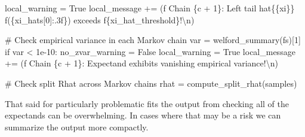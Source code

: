 \documentclass[
  letterpaper,
  DIV=11,
  numbers=noendperiod]{scrartcl}
\newenvironment{Shaded}{\begin{snugshade}}{\end{snugshade}}
\newcommand{\CharTok}[1]{\textcolor[rgb]{0.13,0.47,0.30}{#1}}
\newcommand{\CommentTok}[1]{\textcolor[rgb]{0.37,0.37,0.37}{#1}}
\newcommand{\ControlFlowTok}[1]{\textcolor[rgb]{0.00,0.23,0.31}{#1}}
\newcommand{\DecValTok}[1]{\textcolor[rgb]{0.68,0.00,0.00}{#1}}
\newcommand{\FloatTok}[1]{\textcolor[rgb]{0.68,0.00,0.00}{#1}}
\newcommand{\NormalTok}[1]{\textcolor[rgb]{0.00,0.23,0.31}{#1}}
\newcommand{\OperatorTok}[1]{\textcolor[rgb]{0.37,0.37,0.37}{#1}}
\newcommand{\SpecialCharTok}[1]{\textcolor[rgb]{0.37,0.37,0.37}{#1}}
\newcommand{\SpecialStringTok}[1]{\textcolor[rgb]{0.13,0.47,0.30}{#1}}
\newcommand{\StringTok}[1]{\textcolor[rgb]{0.13,0.47,0.30}{#1}}
\newcommand{\VariableTok}[1]{\textcolor[rgb]{0.07,0.07,0.07}{#1}}
\begin{document}
\begin{Shaded}
\begin{Highlighting}[]
\NormalTok{        local\_warning }\OperatorTok{=} \VariableTok{True}
\NormalTok{        local\_message }\OperatorTok{+=}\NormalTok{ (}\SpecialStringTok{f\textquotesingle{}  Chain }\SpecialCharTok{\{}\NormalTok{c }\OperatorTok{+} \DecValTok{1}\SpecialCharTok{\}}\SpecialStringTok{: Left tail hat}\CharTok{\{\{}\SpecialStringTok{xi}\CharTok{\}\}}\SpecialStringTok{ \textquotesingle{}}
                          \SpecialStringTok{f\textquotesingle{}(}\SpecialCharTok{\{}\NormalTok{xi\_hats[}\DecValTok{0}\NormalTok{]}\SpecialCharTok{:.3f\}}\SpecialStringTok{) exceeds \textquotesingle{}}
                          \SpecialStringTok{f\textquotesingle{}}\SpecialCharTok{\{}\NormalTok{xi\_hat\_threshold}\SpecialCharTok{\}}\SpecialStringTok{!}\CharTok{\textbackslash{}n}\SpecialStringTok{\textquotesingle{}}\NormalTok{)}
      
      \CommentTok{\# Check empirical variance in each Markov chain}
\NormalTok{      var }\OperatorTok{=}\NormalTok{ welford\_summary(fs)[}\DecValTok{1}\NormalTok{]}
      \ControlFlowTok{if}\NormalTok{ var }\OperatorTok{\textless{}} \FloatTok{1e{-}10}\NormalTok{:}
\NormalTok{        no\_zvar\_warning }\OperatorTok{=} \VariableTok{False}
\NormalTok{        local\_warning }\OperatorTok{=} \VariableTok{True}
\NormalTok{        local\_message }\OperatorTok{+=}\NormalTok{ (}\SpecialStringTok{f\textquotesingle{}  Chain }\SpecialCharTok{\{}\NormalTok{c }\OperatorTok{+} \DecValTok{1}\SpecialCharTok{\}}\SpecialStringTok{: Expectand exhibits \textquotesingle{}}
                          \StringTok{\textquotesingle{}vanishing empirical variance!}\CharTok{\textbackslash{}n}\StringTok{\textquotesingle{}}\NormalTok{)}
    
    \CommentTok{\# Check split Rhat across Markov chains}
\NormalTok{    rhat }\OperatorTok{=}\NormalTok{ compute\_split\_rhat(samples)}
\end{Highlighting}
\end{Shaded}

That said for particularly problematic fits the output from checking all
of the expectands can be overwhelming. In cases where that may be a risk
we can summarize the output more compactly.
\end{document}
